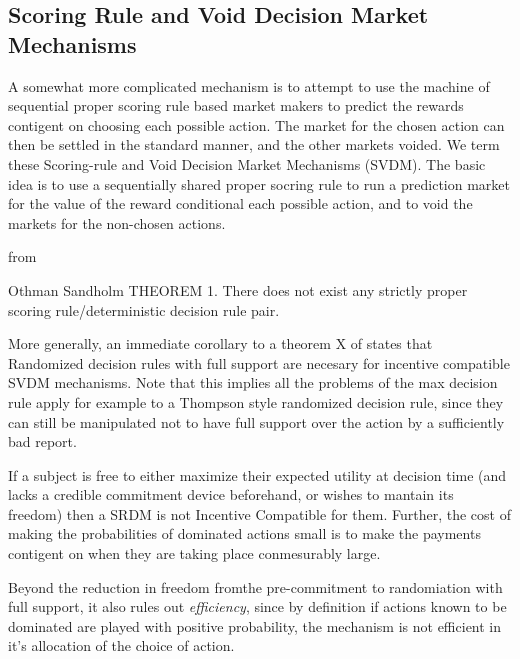


\subsection{Scoring Rule and Void Decision Market Mechanisms}


A somewhat more complicated mechanism is to attempt to use the machine of sequential proper scoring rule based market makers to predict the rewards contigent on choosing each possible action. The market for the chosen action can then be settled in the standard manner, and the other markets voided. 
We term these Scoring-rule and Void Decision Market Mechanisms (SVDM). The basic idea is to use a sequentially shared proper socring rule to run a prediction market for the value of the reward conditional each possible action, and to void the markets for the non-chosen actions.  

	from \cite{othman2010decision}


Othman Sandholm THEOREM 1. There does not exist any strictly proper scoring rule/deterministic decision rule pair.

More generally, an immediate corollary to a theorem X of \cite{chen2014eliciting} states that Randomized decision rules with full support are necesary for incentive compatible SVDM mechanisms.
Note that this implies all the problems of the max decision rule apply for example to a Thompson style randomized decision rule, since they can still be manipulated not to have full support over the action by a sufficiently bad report.

If a subject is free to either maximize their expected utility at decision time (and lacks a credible commitment device beforehand, or wishes to mantain its freedom) then a SRDM is not Incentive Compatible for them. Further, the cost of making the probabilities of dominated actions small is to make the payments contigent on when they are taking place conmesurably large.

Beyond the reduction in freedom fromthe pre-commitment to randomiation with full support, it also rules out \emph{efficiency}, since by definition if actions known to be dominated are played with positive probability, the mechanism is not efficient in it's allocation of the choice of action. 

